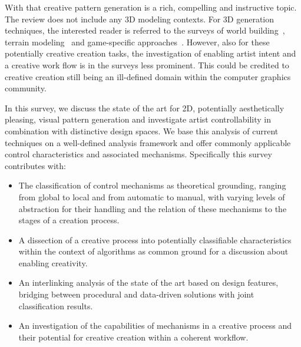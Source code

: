 With that creative pattern generation is a rich, compelling and instructive topic.
The review does not include any 3D modeling contexts. For 3D generation techniques, the interested reader is referred to the surveys of world building~\cite{smelik_2014_aso, aliaga_2016_ipm}, terrain modeling~\cite{galin_2019_aro} and game-specific approaches~\cite{hendrikx_2013_pcg, togelius_2011_sbp}.
However, also for these potentially creative creation tasks, the investigation of enabling artist intent and a creative work flow is in the surveys less prominent. This could be credited to creative creation still being an ill-defined domain within the computer graphics community. 

In this survey, we discuss the state of the art for 2D, potentially aesthetically pleasing, visual pattern generation and investigate artist controllability in combination with distinctive design spaces. We base this analysis of current techniques on a well-defined analysis framework and offer commonly applicable control characteristics and associated mechanisms. Specifically this survey contributes with:


\begin{itemize}
    \item The classification of control mechanisms as theoretical grounding, ranging from global to local and from automatic to manual, with varying levels of abstraction for their handling and the relation of these mechanisms to the stages of a creation process. 
    \item A dissection of a creative process into potentially classifiable characteristics within the context of algorithms as common ground for a discussion about enabling creativity.
    \item An interlinking analysis of the state of the art based on design features, bridging between procedural and data-driven solutions with joint classification results. 
    \item An investigation of the capabilities of mechanisms in a creative process and their potential for creative creation within a coherent workflow.
\end{itemize}

